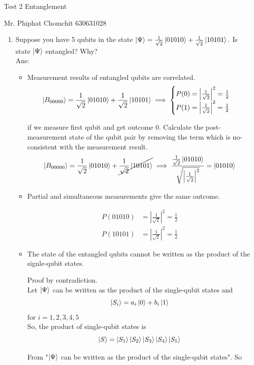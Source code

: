 \documentclass[12pt, a4paper]{article}
\begin{document}
	\begin{center}
		Test 2  Entanglement
	\end{center}
	
	Mr. Phiphat Chomchit 630631028
	\begin{enumerate}
		\item Suppose you have 5 qubits in the state  $\ket{\Psi} = \frac{1}{\sqrt{2}}\ket{01010} + \frac{1}{\sqrt{2}}\ket{10101} .$ Is state $\ket{\Psi}$ entangled? Why?\\
		
		Ans:
		\begin{itemize}
			\item Measurement results of entangled qubits are correlated.
			$$\ket{B_{00000} } =  \frac{1}{\sqrt{2}}\ket{01010} + \frac{1}{\sqrt{2}}\ket{10101} \implies 
			\begin{cases}
				P(0) =  \left|\frac{1}{\sqrt{2}}\right|^2 = \frac{1}{2}\\
				P(1) =  \left|\frac{1}{\sqrt{2}}\right|^2 = \frac{1}{2}
			\end{cases}
			$$
			
			if we measure first qubit and get outcome 0. Calculate the post-measurement state of the qubit pair by removing the term which is no-consistent with the measurement result.
			$$\ket{B_{00000} } = \frac{1}{\sqrt{2}}\ket{01010} + \cancel{\frac{1}{\sqrt{2}}\ket{10101}} \implies \frac{\frac{1}{\sqrt{2}}\ket{01010}}{\sqrt{\left|\frac{1}{\sqrt{2}}\right|^2}} = \ket{01010}$$
			\item Partial and simultaneous measurements give the same outcome.
			
			\begin{align}
				P(01010) &= \left|\frac{1}{\sqrt{2}}\right|^2 = \frac{1}{2}\\
				P(10101) &= \left|\frac{1}{\sqrt{2}}\right|^2 = \frac{1}{2}
			\end{align}
			\item The state of the entangled qubits cannot be written as the product of the signle-qubit states.
			
			Proof by contradiction.\\
			Let $\ket{\Psi}$ can be written as the product of the single-qubit states and
			$$\ket{S_i} = a_i\ket{0} + b_i\ket{1}$$
			for $i = 1, 2, 3, 4, 5$\\
			So, the product of single-qubit states is
			$$\ket{S} = \ket{S_1}\ket{S_2}\ket{S_3}\ket{S_4}\ket{S_5}$$
			
			From "$\ket{\Psi}$ can be written as the product of the single-qubit states". So
			

\end{itemize}
\end{enumerate}
\end{document}
